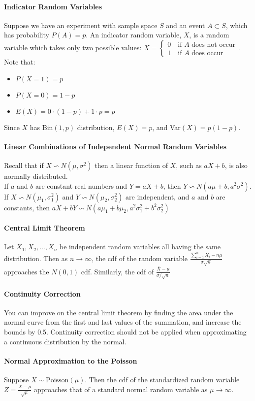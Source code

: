 \documentclass[10pt,letter]{article}
\begin{document}
\paragraph{Indicator Random Variables} Suppose we have an experiment with sample space $S$ and an event $A\subset S$, which has probability $P(A)=p$. An indicator random variable, $X$, is a random variable which takes only two possible values: $X = \begin{cases} 0 \quad\text{if }A\text{ does not occur} \\ 1 \quad\text{if } A \text{ does occur} \end{cases}$. Note that: \begin{itemize}
    \item $P(X=1)=p$
    \item $P(X=0) = 1-p$
    \item $E(X) = 0\cdot (1-p) + 1\cdot p = p$
\end{itemize}
Since $X$ has Bin$(1,p)$ distribution, $E(X) = p$, and Var$(X) = p(1-p)$. 

\paragraph{Linear Combinations of Independent Normal Random Variables} Recall that if $X\backsim N(\mu, \sigma^2)$ then a linear function of $X$, such as $aX+b$, is also normally distributed. \\ 
If $a$ and $b$ are constant real numbers and $Y=aX+b$, then $Y\backsim N(a\mu+b, a^2\sigma^2)$. \\ 
If $X\backsim N(\mu_1, \sigma_1^2)$ and $Y\backsim N(\mu_2, \sigma_2^2)$ are independent, and $a$ and $b$ are constants, then $aX + bY \backsim N(a\mu_1+b\mu_2, a    ^2\sigma_1^2+b^2\sigma_2^2)$

\paragraph{Central Limit Theorem} Let $X_1,X_2,\ldots,X_n$ be independent random variables all having the same distribution. Then as $n\rightarrow\infty$, the cdf of the random variable $\frac{\sum_{i=1}^nX_i-n\mu}{\sigma\sqrt{n}}$ approaches the $N(0,1)$ cdf. Similarly, the cdf of $\frac{\bar{X}-\mu}{\sigma/\sqrt{n}}$

\paragraph{Continuity Correction} You can improve on the central limit theorem by finding the area under the normal curve from the first and last values of the summation, and increase the bounds by 0.5. Continuity correction should not be applied when approximating a continuous distribution by the normal. 

\paragraph{Normal Approximation to the Poisson} Suppose $X\sim \text{Poisson}(\mu)$. Then the cdf of the standardized random variable $Z=\frac{X-\mu}{\sqrt{\mu}}$ approaches that of a standard normal random variable as $\mu\rightarrow\infty$. 
\end{document}
